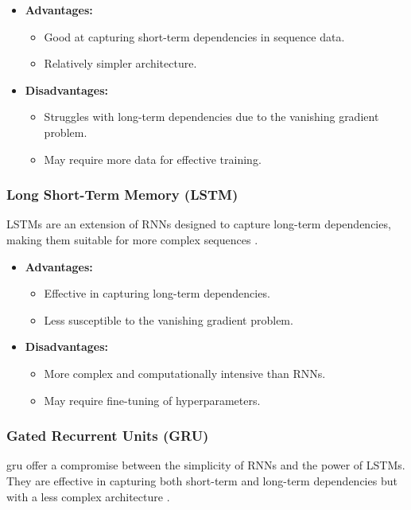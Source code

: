     \begin{itemize}
        \item \textbf{Advantages:}
        \begin{itemize}
            \item Good at capturing short-term dependencies in sequence data.
            \item Relatively simpler architecture.
        \end{itemize}
        \item \textbf{Disadvantages:}
        \begin{itemize}
            \item Struggles with long-term dependencies due to the vanishing gradient problem.
            \item May require more data for effective training.
        \end{itemize}
    \end{itemize}

    \subsubsection{Long Short-Term Memory (LSTM)}
    LSTMs are an extension of RNNs designed to capture long-term dependencies, making them suitable for more complex sequences \cite{hochreiter_long_1997}.

    \begin{itemize}
        \item \textbf{Advantages:}
        \begin{itemize}
            \item Effective in capturing long-term dependencies.
            \item Less susceptible to the vanishing gradient problem.
        \end{itemize}
        \item \textbf{Disadvantages:}
        \begin{itemize}
            \item More complex and computationally intensive than RNNs.
            \item May require fine-tuning of hyperparameters.
        \end{itemize}
    \end{itemize}

    \subsubsection{Gated Recurrent Units (GRU)}
    \acrfull{gru} offer a compromise between the simplicity of RNNs and the power of LSTMs. They are effective in capturing both short-term and long-term dependencies but with a less complex architecture \cite{chung_empirical_2014}.

